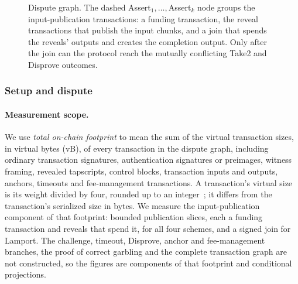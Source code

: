 \documentclass[11pt]{article}
\begin{document}
\begin{figure}[t!]\centering
{}
\caption{Dispute graph. The dashed Assert$_1,\ldots,$Assert$_k$ node groups the input-publication transactions: a funding transaction, the reveal transactions that publish the input chunks, and a join that spends the reveals' outputs and creates the completion output. Only after the join can the protocol reach the mutually conflicting Take2 and Disprove outcomes.}
\label{fig:graph}
\end{figure}

\subsubsection{Setup and dispute}\label{sec:dispute}

\paragraph{Measurement scope.} We use \emph{total on-chain footprint}
to mean the sum of the virtual transaction sizes, in virtual bytes (vB), of
every transaction in the dispute graph, including ordinary transaction
signatures, authentication signatures or preimages, witness framing, revealed
tapscripts, control blocks, transaction inputs and outputs, anchors, timeouts
and fee-management transactions. A transaction's virtual size is its weight
divided by four, rounded up to an integer~\cite{bip141}; it differs from
the transaction's serialized size in bytes. We measure the input-publication component
of that footprint: bounded publication slices, each a funding transaction and reveals that spend it, for all four schemes, and a signed join for Lamport. The challenge, timeout, Disprove,
anchor and fee-management branches, the proof of correct garbling and the
complete transaction graph are not constructed, so the
figures are components of that footprint and conditional projections.
\end{document}
